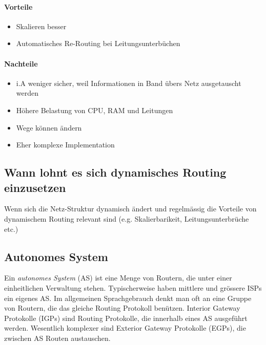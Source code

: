 \documentclass[a4paper,12pt]{article}
\begin{document}
\paragraph{Vorteile}
\begin{itemize}
\item Skalieren besser
\item Automatisches Re-Routing bei Leitungsunterbüchen
\end{itemize}

\paragraph{Nachteile}
\begin{itemize}
\item i.A weniger sicher, weil Informationen in Band übers Netz ausgetauscht werden
\item Höhere Belastung von CPU, RAM und Leitungen
\item Wege können ändern
\item Eher komplexe Implementation
\end{itemize}



\subsection{Wann lohnt es sich dynamisches Routing einzusetzen}
Wenn sich die Netz-Struktur dynamisch ändert und regelmässig die Vorteile von dynamischem Routing relevant sind (e.g. Skalierbarikeit, Leitungsunterbrüche etc.)

\subsection{Autonomes System}
Ein \emph{autonomes System} (AS) ist eine Menge von Routern, die unter einer einheitlichen Verwaltung stehen. Typischerweise haben mittlere und grössere ISPs ein eigenes AS. Im allgemeinen Sprachgebrauch denkt man oft an eine Gruppe von Routern, die das gleiche Routing Protokoll benützen. Interior Gateway Protokolle (IGPs) sind Routing Protokolle, die innerhalb eines AS ausgeführt werden. Wesentlich komplexer sind Exterior Gateway Protokolle (EGPs), die zwischen AS Routen austauschen.
\end{document}
